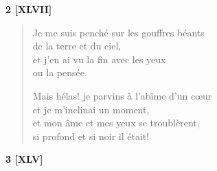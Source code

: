 \bigskip



\begin{center}
  \textbf{2 [XLVII]}
\end{center}

\begin{verse}
  Je me suis penché sur les gouffres béants \\
  de la terre et du ciel, \\
  et j'en ai vu la fin avec les yeux \\
  ou la pensée.

  Mais hélas! je parvins à l'abîme d'un cœur \\
  et je m'inclinai un moment, \\
  et mon âme et mes yeux se troublèrent, \\
  si profond et si noir il était!
\end{verse}




\pagebreak



\begin{center}
  \textbf{3 [XLV]}
\end{center}

